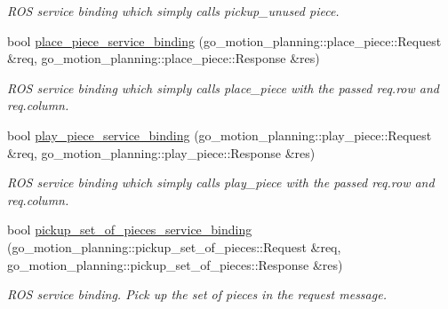 \begin{DoxyCompactItemize}
\begin{DoxyCompactList}\small\item\em R\+OS service binding which simply calls pickup\+\_\+unused piece. \end{DoxyCompactList}\item 
\mbox{\label{classgo__motion__planner_ab93c5f49f503441b9e3917a8bfb31e73}} 
bool \hyperlink{classgo__motion__planner_ab93c5f49f503441b9e3917a8bfb31e73}{place\+\_\+piece\+\_\+service\+\_\+binding} (go\+\_\+motion\+\_\+planning\+::place\+\_\+piece\+::\+Request \&req, go\+\_\+motion\+\_\+planning\+::place\+\_\+piece\+::\+Response \&res)
\begin{DoxyCompactList}\small\item\em R\+OS service binding which simply calls place\+\_\+piece with the passed req.\+row and req.\+column. \end{DoxyCompactList}\item 
\mbox{\label{classgo__motion__planner_a774c19f7198702545b74c71b98efa538}} 
bool \hyperlink{classgo__motion__planner_a774c19f7198702545b74c71b98efa538}{play\+\_\+piece\+\_\+service\+\_\+binding} (go\+\_\+motion\+\_\+planning\+::play\+\_\+piece\+::\+Request \&req, go\+\_\+motion\+\_\+planning\+::play\+\_\+piece\+::\+Response \&res)
\begin{DoxyCompactList}\small\item\em R\+OS service binding which simply calls play\+\_\+piece with the passed req.\+row and req.\+column. \end{DoxyCompactList}\item 
bool \hyperlink{classgo__motion__planner_a89fdde820a08474e8b43d1ef5b69e8fd}{pickup\+\_\+set\+\_\+of\+\_\+pieces\+\_\+service\+\_\+binding} (go\+\_\+motion\+\_\+planning\+::pickup\+\_\+set\+\_\+of\+\_\+pieces\+::\+Request \&req, go\+\_\+motion\+\_\+planning\+::pickup\+\_\+set\+\_\+of\+\_\+pieces\+::\+Response \&res)
\begin{DoxyCompactList}\small\item\em R\+OS service binding. Pick up the set of pieces in the request message. \end{DoxyCompactList}\end{DoxyCompactItemize}
